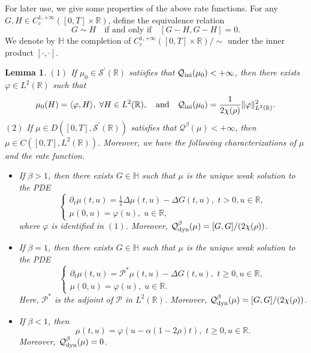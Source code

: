 \documentclass[reqno,11pt]{amsart}
\numberwithin{equation}{section}
\newtheorem{lemma}[theorem]{Lemma}
\newcommand{\R}{\mathbb{R}}
\newcommand{\Scal}{\mathcal{S}}
\begin{document}
For later use, we give some properties of the above rate functions.  For any $G,H \in C_c^{1, +\infty}([0, T]\times \R)$, define the equivalence relation  
\[G\sim H \quad \text{if and only if} \quad [G-H, G-H]=0.\] 
We denote by $\mathbb{H}$ the completion of $C_c^{1, +\infty}([0, T]\times \R)/\sim$ under the inner product $[\cdot, \cdot]$. 

\begin{lemma}\label{lemma finite rate} 
$(1)$ If $\mu_0 \in \Scal^\prime(\R)$ satisfies that $\mathcal{Q}_{\rm ini}(\mu_0)<+\infty$, then there exists $\varphi \in L^2(\R)$ such that
\[
\mu_0 (H) = \langle \varphi, H\rangle, \; \forall H \in L^2 (\R), \quad \text{and} \quad \mathcal{Q}_{\rm ini}(\mu_0)=\frac{1}{2\chi(\rho)} \|\varphi\|_{L^2 (\R)}^2.
\]
$(2)$ If $\mu\in D ([0, T], \Scal^\prime(\R))$ satisfies that $\mathcal{Q}^\beta(\mu)<+\infty$, then $\mu\in C([0, T], L^2(\R))$. Moreover, we have the following characterizations of  $\mu$ and the rate function.

\begin{itemize}
	\item If  $\beta>1$, then there exists $G\in \mathbb{H}$ such that $\mu$ is the unique weak solution to the PDE
	\[\begin{cases}
	\partial_t \mu(t,u)=\frac{1}{2}\Delta\mu(t,u)-\Delta G(t,u), \text{~}t> 0, u\in \mathbb{R},\\
	\mu(0,u) = \varphi (u), \; u \in \R,
	\end{cases}\]
where $\varphi$ is identified in $(1)$. Moreover, $\mathcal{Q}^\beta_{\rm dyn}(\mu)=[G,G] / (2 \chi(\rho))$.
\item If  $\beta=1$, then there exists $G\in \mathbb{H}$ such that $\mu$ is the unique weak solution to the PDE
\[\begin{cases}
	\partial_t \mu(t,u)=\mathcal{P}^* \mu(t,u)-\Delta G(t,u), \text{~}t\geq 0, u\in \mathbb{R},\\
	\mu(0,u) = \varphi (u), \; u \in \R.
\end{cases}\]
Here, $\mathcal{P}^*$ is the adjoint of $\mathcal{P}$ in $L^2 (\R)$. Moreover, $\mathcal{Q}^\beta_{\rm dyn}(\mu)=[G,G] / (2 \chi(\rho))$.
\item If  $\beta< 1$, then 
\[
\mu(t,u)=\varphi( u-\alpha(1-2\rho)t), \text{~}t\geq 0, u\in \mathbb{R}.
\]
Moreover, $\mathcal{Q}^\beta_{\rm dyn}(\mu)=0$.
\end{itemize}
\end{lemma}
\end{document}
